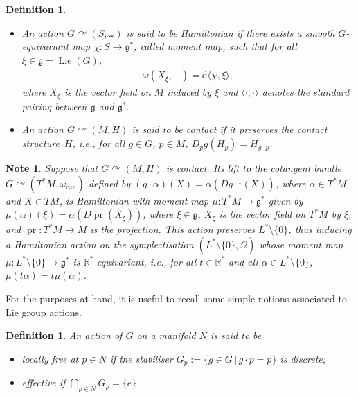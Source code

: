 \documentclass[10pt,a4paper]{amsart}
\numberwithin{equation}{section}
\newtheorem{Definition}[Theorem]{Definition}
\newtheorem{Note}[Theorem]{Note}
\newcommand{\de}{\mathrm{d}} %
\newcommand{\CM}{(M,H)} %
\newcommand{\SM}{(S,\omega)} %
\newcommand{\SYM}{L^* \setminus \{0\}} %
\newcommand{\RR}{\mathbb{R}}
\begin{document}
\begin{Definition}\label{defn:ham_ctct}\quad
 \begin{itemize}\itemsep=0pt
 \item An action $G \curvearrowright \SM$ is said to be {\it Hamiltonian} if there exists a smooth $G$-equivariant map $\chi\colon S \to \mathfrak{g}^*$, called {\it moment map}, such that for all $\xi \in \mathfrak{g} = \operatorname{Lie}(G)$,
 \begin{gather*}
 \omega(X_{\xi}, -) = \de \langle \chi, \xi \rangle,
 \end{gather*}
 where $X_{\xi}$ is the vector f\/ield on $M$ induced by $\xi$ and $\langle \cdot,\cdot \rangle$ denotes the standard pairing between $\mathfrak{g}$ and $\mathfrak{g}^*$.
 \item An action $G \curvearrowright \CM$ is said to be {\it contact} if it preserves the contact structure~$H$, i.e., for all $g \in G$, $p \in M$, $D_pg(H_p) = H_{g \cdot p}$.
 \end{itemize}
\end{Definition}

\begin{Note}\label{obs:contact_action_lift}
Suppose that $G \curvearrowright \CM$ is contact. Its lift to the cotangent bundle $G \curvearrowright (T^*M,\omega_{\mathrm{can}})$ def\/ined by $(g \cdot \alpha)(X) = \alpha(D g^{-1}(X))$, where $\alpha \in T^*M$ and $X \in TM$, is Hamiltonian with moment map $\mu\colon T^*M \to \mathfrak{g}^*$ given by $\mu(\alpha)(\xi) = \alpha (D \operatorname{pr} (X_{\xi} ) )$, where $\xi \in \mathfrak{g}$, $X_{\xi}$ is the vector f\/ield on $T^*M$ by $\xi$, and $\operatorname{pr} \colon T^*M \to M$ is the projection. This action preserves $L^* \setminus \{0\}$, thus inducing a Hamiltonian action on the symplectisation $(\SYM,\Omega)$ whose moment map $\mu \colon \SYM \to \mathfrak{g}^*$ is $\RR^*$-equivariant, i.e., for all $t \in
\RR^*$ and all $\alpha \in \SYM$, $\mu(t\alpha) = t\mu(\alpha)$.
\end{Note}

For the purposes at hand, it is useful to recall some simple notions associated to Lie group actions.

\begin{Definition}\label{defn:action}
 An action of $G$ on a manifold $N$ is said to be
 \begin{itemize}\itemsep=0pt
 \item {\it locally free} at $p \in N$ if the stabiliser $G_p := \{ g \in G \,|\, g \cdot p = p \}$ is discrete;
 \item {\it effective} if $\bigcap\limits_{p \in N} G_p = \{e\}$.
 \end{itemize}
\end{Definition}
\end{document}
